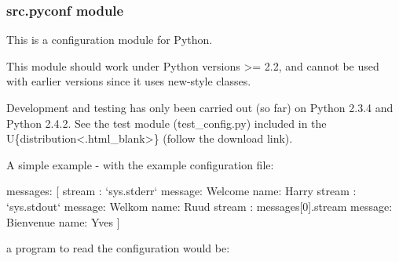 \documentclass[a4paper,10pt,english]{sphinxmanual}
\begin{document}
\subsubsection{src.pyconf module}
\label{\detokenize{commands/apidoc/src:src-pyconf-module}}\label{\detokenize{commands/apidoc/src:module-src.pyconf}}
This is a configuration module for Python.

This module should work under Python versions \textgreater{}= 2.2, and cannot be used with
earlier versions since it uses new-style classes.

Development and testing has only been carried out (so far) on Python 2.3.4 and
Python 2.4.2. See the test module (test\_config.py) included in the
U\{distribution\textless{}.html\textbar{}\_blank\textgreater{}\} (follow the
download link).

A simple example - with the example configuration file:

%
\begin{sphinxVerbatim}[commandchars=\\\{\}]
messages:
[
  \PYGZob{}
    stream : {}`sys.stderr{}`
    message: \PYGZsq{}Welcome\PYGZsq{}
    name: \PYGZsq{}Harry\PYGZsq{}
  \PYGZcb{}
  \PYGZob{}
    stream : {}`sys.stdout{}`
    message: \PYGZsq{}Welkom\PYGZsq{}
    name: \PYGZsq{}Ruud\PYGZsq{}
  \PYGZcb{}
  \PYGZob{}
    stream : \PYGZdl{}messages[0].stream
    message: \PYGZsq{}Bienvenue\PYGZsq{}
    name: Yves
  \PYGZcb{}
]
\end{sphinxVerbatim}

a program to read the configuration would be:

%
\begin{sphinxVerbatim}[commandchars=\\\{\}]
   

  
  
   
         
           
      
         
\end{sphinxVerbatim}
\end{document}
